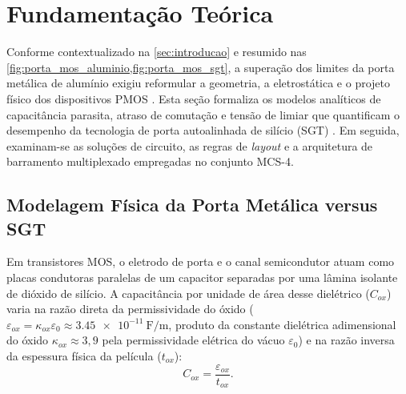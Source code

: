 
\section{Fundamentação Teórica}
\label{sec:fundamentacao}

Conforme contextualizado na \cref{sec:introducao} e resumido nas \cref{fig:porta_mos_aluminio,fig:porta_mos_sgt}, a superação dos limites da porta metálica de alumínio exigiu reformular a geometria, a eletrostática e o projeto físico dos dispositivos PMOS \cite{cavin2012, mead1980}. Esta seção formaliza os modelos analíticos de capacitância parasita, atraso de comutação e tensão de limiar que quantificam o desempenho da tecnologia de porta autoalinhada de silício (SGT) \cite{faggin1970, sze2006}. Em seguida, examinam-se as soluções de circuito, as regras de \textit{layout} e a arquitetura de barramento multiplexado empregadas no conjunto MCS-4.

\subsection{Modelagem Física da Porta Metálica versus SGT}
\label{subsec:modelagem_fisica_sgt}

Em transistores MOS, o eletrodo de porta e o canal semicondutor atuam como placas condutoras paralelas de um capacitor separadas por uma lâmina isolante de dióxido de silício. A capacitância por unidade de área desse dielétrico ($C_{ox}$) varia na razão direta da permissividade do óxido ($\varepsilon_{ox} = \kappa_{ox}\varepsilon_0 \approx \SI{3,45e-11}{\farad\per\meter}$, produto da constante dielétrica adimensional do óxido $\kappa_{ox} \approx 3{,}9$ pela permissividade elétrica do vácuo $\varepsilon_0$) e na razão inversa da espessura física da película ($t_{ox}$):
\begin{equation}
\label{eq:cox}
C_{ox} = \frac{\varepsilon_{ox}}{t_{ox}}.
\end{equation}

